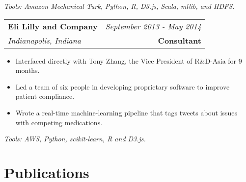 \documentclass[10pt,a4paper]{article}
\begin{document}
  \vspace*{2mm}\setlength\parindent{2mm}\begin{minipage}{16.8cm}
    \textit{Tools: Amazon Mechanical Turk, Python, R, D3.js, Scala, mllib, and HDFS.}
  \end{minipage}

  \vspace*{3mm}\noindent\begin{tabularx}{17cm}{X r}
    \textbf{Eli Lilly and Company} & \textit{September 2013 - May 2014} \\
    \textit{Indianapolis, Indiana} & \textbf{Consultant} 
  \end{tabularx}

  \vspace*{1mm}\noindent\begin{minipage}{17cm}
    \begin{itemize}[leftmargin=6mm,topsep=0mm,itemsep=-1mm]
      \item Interfaced directly with Tony Zhang, the Vice President of R\&D-Asia for 9 months.
      \item Led a team of six people in developing proprietary software to improve patient compliance.
      \item Wrote a real-time machine-learning pipeline that tags tweets about issues with competing medications.
    \end{itemize}
  \end{minipage}

  \vspace*{2mm}\setlength\parindent{2mm}\begin{minipage}{16.8cm}
    \textit{Tools: AWS, Python, scikit-learn, R and D3.js.} 
  \end{minipage}

  \vspace*{3mm}\section*{Publications}
\end{document}
